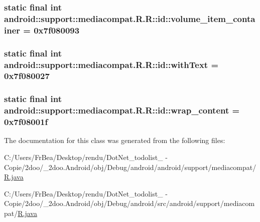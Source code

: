 \hypertarget{classandroid_1_1support_1_1mediacompat_1_1_r_1_1id_545c12699696fba3a07945f54df4d05d}{
\subsubsection[{volume\_\-item\_\-container}]{\setlength{\rightskip}{0pt plus 5cm}static final int android::support::mediacompat.R.R::id::volume\_\-item\_\-container = 0x7f080093}}
\label{classandroid_1_1support_1_1mediacompat_1_1_r_1_1id_545c12699696fba3a07945f54df4d05d}


\hypertarget{classandroid_1_1support_1_1mediacompat_1_1_r_1_1id_b6aa5f4e85a227f8a6874b0febd60967}{
\subsubsection[{withText}]{\setlength{\rightskip}{0pt plus 5cm}static final int android::support::mediacompat.R.R::id::withText = 0x7f080027}}
\label{classandroid_1_1support_1_1mediacompat_1_1_r_1_1id_b6aa5f4e85a227f8a6874b0febd60967}


\hypertarget{classandroid_1_1support_1_1mediacompat_1_1_r_1_1id_e497dbc2740a1ef5d7482b4b4a59ba51}{
\subsubsection[{wrap\_\-content}]{\setlength{\rightskip}{0pt plus 5cm}static final int android::support::mediacompat.R.R::id::wrap\_\-content = 0x7f08001f}}
\label{classandroid_1_1support_1_1mediacompat_1_1_r_1_1id_e497dbc2740a1ef5d7482b4b4a59ba51}




The documentation for this class was generated from the following files:\begin{CompactItemize}
\item 
C:/Users/FrBea/Desktop/rendu/DotNet\_\-todolist\_ - Copie/2doo/\_\-2doo.Android/obj/Debug/android/android/support/mediacompat/\hyperlink{android_2support_2mediacompat_2_r_8java}{R.java}\item 
C:/Users/FrBea/Desktop/rendu/DotNet\_\-todolist\_ - Copie/2doo/\_\-2doo.Android/obj/Debug/android/src/android/support/mediacompat/\hyperlink{src_2android_2support_2mediacompat_2_r_8java}{R.java}\end{CompactItemize}
